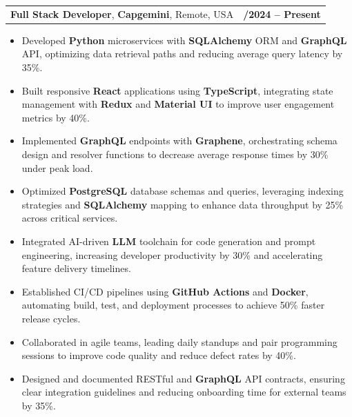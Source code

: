 \documentclass[letterpaper,11pt]{article}
\makeatletter
\newcommand{\resumeItem}[1]{
  \item\footnotesize{
    {#1 \vspace{-2pt}}
  }
}
\newcommand{\resumeSubheading}[4]{
  \vspace{-2pt}\item
    \begin{tabular*}{1.0\textwidth}[t]{l@{\extracolsep{\fill}}r}
      \textbf{\fontsize{10pt}{14pt}\selectfont #3}, \textbf{\fontsize{10pt}{14pt}\selectfont #1}, \fontsize{10pt}{14pt}\selectfont #4 & \textbf{\fontsize{10pt}{14pt}\selectfont #2} \\
    \end{tabular*}\vspace{-7pt}
}
\newcommand{\resumeItemListStart}{\begin{itemize}[leftmargin=*]}
\newcommand{\resumeItemListEnd}{\end{itemize}\vspace{-5pt}}
\makeatother
\begin{document}
    \resumeSubheading
        {Capgemini}{01/2024 -- Present}
        {Full Stack Developer}{Remote, USA}
      \resumeItemListStart
        \resumeItem{Developed \textbf{Python} microservices with \textbf{SQLAlchemy} ORM and \textbf{GraphQL} API, optimizing data retrieval paths and reducing average query latency by 35\%.}
        \resumeItem{Built responsive \textbf{React} applications using \textbf{TypeScript}, integrating state management with \textbf{Redux} and \textbf{Material UI} to improve user engagement metrics by 40\%.}
        \resumeItem{Implemented \textbf{GraphQL} endpoints with \textbf{Graphene}, orchestrating schema design and resolver functions to decrease average response times by 30\% under peak load.}
        \resumeItem{Optimized \textbf{PostgreSQL} database schemas and queries, leveraging indexing strategies and \textbf{SQLAlchemy} mapping to enhance data throughput by 25\% across critical services.}
        \resumeItem{Integrated AI-driven \textbf{LLM} toolchain for code generation and prompt engineering, increasing developer productivity by 30\% and accelerating feature delivery timelines.}
        \resumeItem{Established CI/CD pipelines using \textbf{GitHub Actions} and \textbf{Docker}, automating build, test, and deployment processes to achieve 50\% faster release cycles.}
        \resumeItem{Collaborated in agile teams, leading daily standups and pair programming sessions to improve code quality and reduce defect rates by 40\%.}
        \resumeItem{Designed and documented RESTful and \textbf{GraphQL} API contracts, ensuring clear integration guidelines and reducing onboarding time for external teams by 35\%.}
      \resumeItemListEnd
\end{document}
